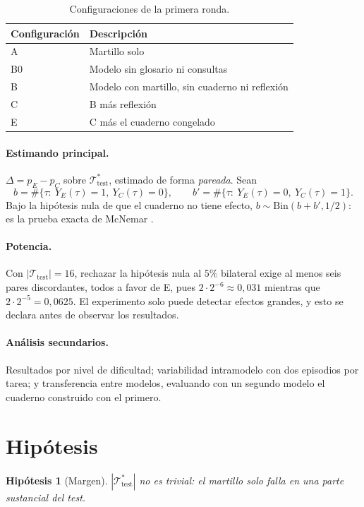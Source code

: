 \documentclass[11pt]{article}
\newtheorem{hypothesis}{Hipótesis}
\theoremstyle{remark}
\newcommand{\T}{\mathcal{T}}
\newcommand{\1}{\mathbb{1}}
\begin{document}
\begin{table}[h]
\centering
\begin{tabular}{@{}ll@{}}
\toprule
Configuración & Descripción\\
\midrule
A & Martillo solo\\
B0 & Modelo sin glosario ni consultas\\
B & Modelo con martillo, sin cuaderno ni reflexión\\
C & B más reflexión\\
E & C más el cuaderno congelado\\
\bottomrule
\end{tabular}
\caption{Configuraciones de la primera ronda.}\label{tab:conf}
\end{table}

\paragraph{Estimando principal.} $\Delta=p_E-p_C$ sobre $\T^*_{\mathrm{test}}$, estimado de forma \emph{pareada}. Sean
\[
b=\#\{\tau:\ Y_E(\tau)=1,\ Y_C(\tau)=0\},\qquad
b'=\#\{\tau:\ Y_E(\tau)=0,\ Y_C(\tau)=1\}.
\]
Bajo la hipótesis nula de que el cuaderno no tiene efecto, $b\sim\mathrm{Bin}(b+b',1/2)$: es la prueba exacta de McNemar \cite{mcnemar1947}.

\paragraph{Potencia.} Con $|\T_{\mathrm{test}}|=16$, rechazar la hipótesis nula al $5\%$ bilateral exige al menos seis pares discordantes, todos a favor de E, pues $2\cdot 2^{-6}\approx 0{,}031$ mientras que $2\cdot 2^{-5}=0{,}0625$. El experimento solo puede detectar efectos grandes, y esto se declara antes de observar los resultados.

\paragraph{Análisis secundarios.} Resultados por nivel de dificultad; variabilidad intramodelo con dos episodios por tarea; y transferencia entre modelos, evaluando con un segundo modelo el cuaderno construido con el primero.

\section{Hipótesis}

\begin{hypothesis}[Margen] $|\T^*_{\mathrm{test}}|$ no es trivial: el martillo solo falla en una parte sustancial del test.\end{hypothesis}
\end{document}
